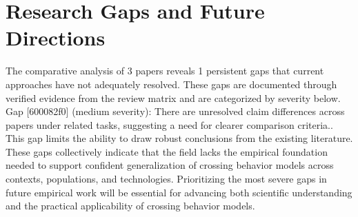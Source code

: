 \documentclass{article}
\begin{document}
\section{Research Gaps and Future Directions}
The comparative analysis of 3 papers reveals 1 persistent gaps that current approaches have not adequately resolved. These gaps are documented through verified evidence from the review matrix and are categorized by severity below. Gap [600082f0] (medium severity): There are unresolved claim differences across papers under related tasks, suggesting a need for clearer comparison criteria.. This gap limits the ability to draw robust conclusions from the existing literature. These gaps collectively indicate that the field lacks the empirical foundation needed to support confident generalization of crossing behavior models across contexts, populations, and technologies. Prioritizing the most severe gaps in future empirical work will be essential for advancing both scientific understanding and the practical applicability of crossing behavior models.
\end{document}
